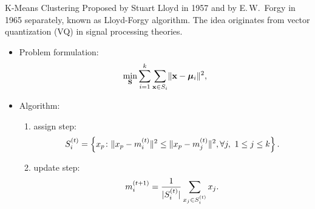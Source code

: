 \begin{frame}[fragile,t]{K-Means Clustering}
	Proposed by Stuart Lloyd in 1957 and by E.\,W.~Forgy in 1965 \cite{Forgy:1965cl} separately, 
	known as Lloyd-Forgy algorithm.
	The idea originates from vector quantization (VQ) in signal processing theories.

	\begin{itemize}
	\item Problem formulation:
		\[ \min_{{\mathbf S}} \sum_{i=1}^{k}\sum_{{\mathbf x} \in S_i} \lVert{\mathbf x} - {\boldsymbol\mu}_i\rVert^2, \]
	\item Algorithm:
		\begin{enumerate}
		\item assign step:
			\[ S_i^{(t)} = \left\{x_p \colon \lVert x_p-m_i^{(t)}\rVert^2 \leq \lVert x_p-m_j^{(t)}\rVert^2,
			\forall j,\ 1\leq j \leq k  \right\}. \]
		\item update step:
			\[ m_i^{(t+1)} = \frac{1}{\lvert S_i^{(t)}\rvert} \sum_{x_j \in S_i^{(t)}} x_j. \]
		\end{enumerate}
	\end{itemize}
\end{frame}